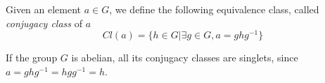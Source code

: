 \begin{definition}
    Given an element $a \in G$, we define the following equivalence class, called \emph{conjugacy class} of $a$
    \begin{equation*}
        Cl(a) = \{h \in G | \exists g \in G, a = g h g^{-1}\}
    \end{equation*}
\end{definition}
\begin{remark}
    If the group $G$ is abelian, all its conjugacy classes are singlets, since $a = ghg^{-1} = hgg^{-1} = h$.
\end{remark}